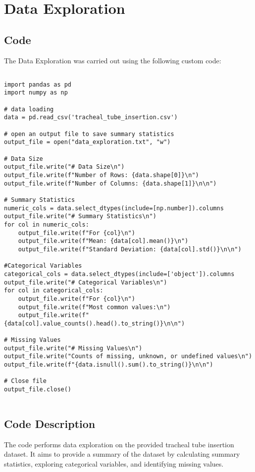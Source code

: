 \documentclass[11pt]{article}
\begin{document}
\section{Data Exploration}
\subsection{{Code}}
The Data Exploration was carried out using the following custom code:

\begin{verbatim}

import pandas as pd
import numpy as np

# data loading
data = pd.read_csv('tracheal_tube_insertion.csv')

# open an output file to save summary statistics
output_file = open("data_exploration.txt", "w")

# Data Size
output_file.write("# Data Size\n")
output_file.write(f"Number of Rows: {data.shape[0]}\n")
output_file.write(f"Number of Columns: {data.shape[1]}\n\n")

# Summary Statistics
numeric_cols = data.select_dtypes(include=[np.number]).columns
output_file.write("# Summary Statistics\n")
for col in numeric_cols:
    output_file.write(f"For {col}\n")
    output_file.write(f"Mean: {data[col].mean()}\n")
    output_file.write(f"Standard Deviation: {data[col].std()}\n\n")
 
#Categorical Variables
categorical_cols = data.select_dtypes(include=['object']).columns
output_file.write("# Categorical Variables\n")
for col in categorical_cols:
    output_file.write(f"For {col}\n")
    output_file.write(f"Most common values:\n")
    output_file.write(f"{data[col].value_counts().head().to_string()}\n\n")

# Missing Values
output_file.write("# Missing Values\n")
output_file.write("Counts of missing, unknown, or undefined values\n")
output_file.write(f"{data.isnull().sum().to_string()}\n\n")

# Close file
output_file.close()


\end{verbatim}

\subsection{Code Description}

The code performs data exploration on the provided tracheal tube insertion dataset. It aims to provide a summary of the dataset by calculating summary statistics, exploring categorical variables, and identifying missing values.
\end{document}
